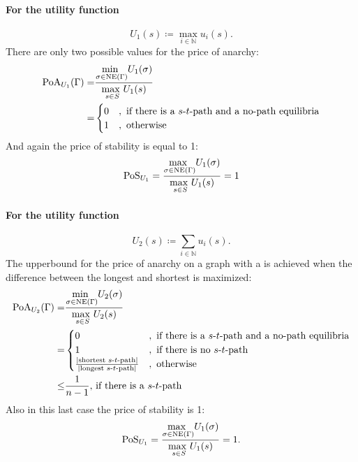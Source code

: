\documentclass{article}
\begin{document}
\paragraph{For the utility function}
\[
    U_1(s) \coloneqq \max_{i\in\mathds{N}} u_i(s).
\]
There are only two possible values for the price of anarchy:
\begin{align*}
    \textup{PoA}_{U_1}(\Gamma) =& \frac{\underset{\sigma\in \textup{NE}(\Gamma)}{\min\ } U_1(\sigma)}{\underset{s\in S}{\max\ } U_1(s)}\\
  =& \begin{cases}
    0 &, \text{ if there is a $s$-$t$-path{} and a no-path equilibria}\\
    1 &, \text{ otherwise}
    \end{cases}
\end{align*}
And again the price of stability is equal to 1:
\begin{align*}
  \textup{PoS}_{U_1} = \frac{\underset{\sigma\in \textup{NE}(\Gamma)}{\max\ } U_1(\sigma)}{\underset{s\in S}{\max\ } U_1(s)} = 1
\end{align*}

\paragraph{For the utility function}
\[
    U_2(s) \coloneqq \sum_{i\in \mathds{N}} u_i(s).
  \]
The upperbound for the price of anarchy on a graph with a \stpath is achieved when the difference between the longest and shortest \stpath is maximized:
\begin{align*}
  \textup{PoA}_{U_2}(\Gamma) =& \frac{\underset{\sigma\in \textup{NE}(\Gamma)}{\min\ } U_2(\sigma)}{\underset{s\in S}{\max\ } U_2(s)}\\
  =&\begin{cases}
    0 &, \text{ if there is a $s$-$t$-path{} and a no-path equilibria}\\
    1 &, \text{ if there is no $s$-$t$-path{}}\\
    \frac{|\text{shortest $s$-$t$-path}|}{|\text{longest $s$-$t$-path}|} &, \text{ otherwise}
  \end{cases}\\
  \leq& \frac{1}{n-1} \text{, if there is a $s$-$t$-path}
\end{align*}
Also in this last case the price of stability is 1:
\begin{align*}
  \textup{PoS}_{U_1} = \frac{\underset{\sigma\in \textup{NE}(\Gamma)}{\max\ } U_1(\sigma)}{\underset{s\in S}{\max\ } U_1(s)} = 1.
\end{align*}
\end{document}
